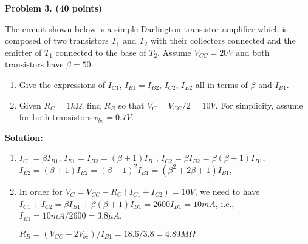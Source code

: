 

\item {\bf Problem 3. (40 points)} 

The circuit shown below is a simple Darlington transistor amplifier which is
composed of two transistors $T_1$ and $T_2$ with their collectors connected 
and the emitter of $T_1$ connected to the base of $T_2$. Assume $V_{CC}=20V$ 
and both transistors have $\beta=50$. 
\begin{enumerate}
\item Give the expressions of $I_{C1}$, $I_{E1}=I_{B2}$, $I_{C2}$, $I_{E2}$
  all in terms of $\beta$ and $I_{B1}$.
\item Given $R_C=1 k\Omega$, find $R_B$ so that $V_C=V_{CC}/2=10V$. For 
  simplicity, assume for both transistors $v_{be}=0.7V$.

\end{enumerate}


{\bf Solution:}

\begin{enumerate}
\item $I_{C1}=\beta I_{B1}$, $I_{E1}=I_{B2}=(\beta+1) I_{B1}$, 
$I_{C2}=\beta I_{B2}=\beta (\beta+1) I_{B1}$, 
$I_{E2}=(\beta+1) I_{B2}=(\beta+1)^2 I_{B1}=(\beta^2+2\beta+1)I_{B1}$, 

\item In order for $V_C=V_{CC}-R_C (I_{C1}+I_{C2})=10V$, we need to have
$I_{C1}+I_{C2}=\beta I_{B1}+\beta (\beta+1) I_{B1}=2600 I_{B1}=10 mA$, i.e.,
$I_{B1}=10 mA/2600=3.8 \mu A$. 

$R_B=(V_{CC}-2V_{be})/I_{B1}=18.6/3.8=4.89 M\Omega$
\end{enumerate}



